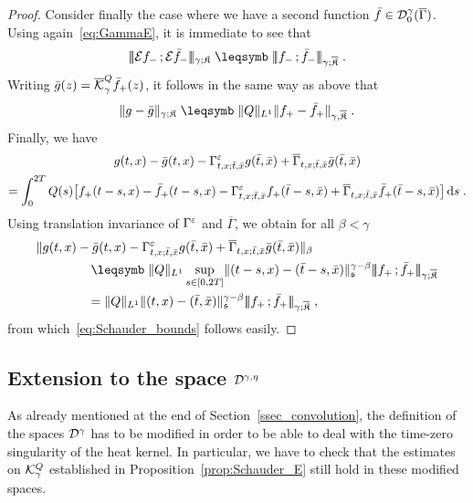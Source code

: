 \documentclass[reqno,11pt]{article}
\def\seminormff#1#2{|\!|\!|#1\,\mathord{;}\,#2|\!|\!|}
\def\fraks{\mathfrak{s}}
\def\fraK{\mathfrak{K}}
\def\fraKbar{\overline{\mathfrak{K}}}
\def\Gammabar{\overline\Gamma}
\begin{document}
\begin{proof}
Consider finally the case where we have a second function $\bar
f\in\cD^\gamma_0(\Gammabar)$. Using again~\eqref{eq:GammaE}, it is immediate to
see that 
\[
 \seminormff{\cE f_-}{\cE \bar f_-}_{\gamma;\fraK}
 \leqs \seminormff{f_-}{\bar f_-}_{\gamma;\fraKbar}\;.
\]
Writing $\bar g(z)=\overline{{\mathcal K}}^Q_\gamma \bar f_+(z)$, it follows in the same
way as above that 
\[
 \norm{g-\bar g}_{\gamma;\fraK} 
 \leqs \norm{Q}_{L^1} \norm{f_+ - \bar f_+}_{\gamma,\fraKbar}\;.
\]
Finally, we have 
\begin{multline*}
g(t,x) - \bar g(t,x) - \Gamma^\eps_{t,x;\bar t,\bar x} g(\bar t,\bar x) 
+ \Gammabar_{t,x;\bar t,\bar x} \bar g(\bar t,\bar x)   \\
 = \int_0^{2T} Q(s) 
\bigbrak{f_+(t-s,x) - \bar f_+(t-s,x) - \Gamma^\eps_{t,x;\bar t,\bar x} f_+(\bar
t-s,\bar x) + \Gammabar_{t,x;\bar t,\bar x} \bar f_+(\bar t-s,\bar x)}\6s\;.  
\end{multline*}
Using translation invariance of $\Gamma^\varepsilon$ and $\Gammabar$, we obtain for all
$\beta<\gamma$ 
\begin{align*}
&\norm{g(t,x) - \bar g(t,x) - \Gamma^\eps_{t,x;\bar t,\bar x} g(\bar t,\bar x) 
+ \Gammabar_{t,x;\bar t,\bar x} \bar g(\bar t,\bar x)}_\beta \\
&\qquad\qquad \leqs 
\norm{Q}_{L^1} \sup_{s\in[0,2T]} \norm{(t-s,x)-(\bar t-s,\bar
x)}^{\gamma-\beta}_\fraks \seminormff{f_+}{\bar f_+}_{\gamma;\fraKbar} \\
&\qquad\qquad =  
\norm{Q}_{L^1} \norm{(t,x)-(\bar t,\bar
x)}^{\gamma-\beta}_\fraks \seminormff{f_+}{\bar f_+}_{\gamma;\fraKbar}\;,
\end{align*}
from which~\eqref{eq:Schauder_bounds} follows easily. 
\end{proof}


\subsection{Extension to the space ${\mathcal D}^{\gamma,\eta}$}
\label{ssec_D_gamma_eta}

As already mentioned at the end of Section~\ref{ssec_convolution}, the
definition of the spaces ${\mathcal D}^\gamma$ has to be modified in order to be able to
deal with the time-zero singularity of the heat kernel. In particular, we have
to check that the estimates on ${\mathcal K}^Q_\gamma$ established in
Proposition~\ref{prop:Schauder_E} still hold in these modified spaces. 
\end{document}
